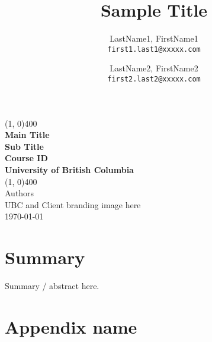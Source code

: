 \documentclass[10pt,letterpaper]{article}
\author{
	LastName1, FirstName1\\
	\texttt{first1.last1@xxxxx.com}
	\and
	LastName2, FirstName2\\
	\texttt{first2.last2@xxxxx.com}
}
\title{Sample Title}
\begin{document}
\begin{titlepage}
	\begin{center}
		\vspace*{3in}
		\line(1, 0){400}\\
		\Huge{\textbf{Main Title}}\\[0.2cm]
		\large{\textbf{Sub Title}}\\[1cm]
		\Large{\textbf{Course ID}}\\
		\textbf{University of British Columbia}\\
		\line(1, 0){400}\\
		\vfill
		\Large{Authors}\\
		UBC and Client branding image here\\

		\today\\
	\end{center}
\end{titlepage}

\section*{Summary}
Summary / abstract here.
\clearpage

\setcounter{secnumdepth}{3}
\tableofcontents
\thispagestyle{empty}
\clearpage

\thispagestyle{empty}
\listoffigures
\listoftables
\newpage

\setcounter{page}{1}


\clearpage
{}



\clearpage
\appendix
\section{Appendix name}\label{appendix:sample-appendix}
\end{document}
